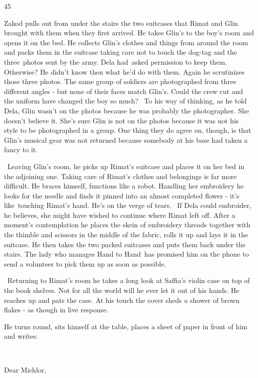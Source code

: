 \documentclass[letterpaper]{article}
\begin{document}
\bigskip

45 

Zakod pulls out from under the stairs the two suitcases that Rimat and Glin brought with them when they first arrived.
He takes Glin's to the boy's room and opens it on the bed. He collects Glin's clothes and things from around the room
and packs them in the suitcase taking care not to touch the dog-tag and the three~photos sent by the army. Dela
had~asked permission to keep them. Otherwise? He didn't know then what he'd do with them. Again he scrutinizes those
three photos. The same group of soldiers are photographed from three different angles - but none of their faces match
Glin's. Could the crew cut and the uniform have changed the boy so much? \ To his way of thinking, as he told Dela,
Glin wasn't on the photos because he was probably the photographer. She doesn't believe it. She's sure Glin is not on
the photos because it was not his style to be photographed in a group. One thing they do agree on, though, is that
Glin's musical gear was not returned because somebody at his base had taken a fancy to it. 

\ Leaving Glin's room, he picks up Rimat's suitcase and places it on her bed in the adjoining one. Taking care of
Rimat's clothes and belongings is far more difficult. He braces himself, functions like a robot. Handling her
embroidery he looks for the needle and finds it pinned into an almost completed flower - it's like~touching Rimat's
hand. He's on the verge of tears{.} \ If Dela could embroider, he believes, she
might have wished to continue where Rimat left off. After a moment's contemplation he places the skein of embroidery
threads together with the thimble and scissors in the middle of the fabric, rolls it up and lays it in the suitcase. He
then takes the two packed suitcases and puts them back under the stairs. The lady who manages {\textquotedbl}Hand to
Hand{\textquotedbl}~has promised him on the phone to send a volunteer to pick them up as soon as possible. 

\ Returning to Rimat's room he takes a long look at Saffia's violin case on top of the book shelves. Not for
all{ }the world will he ever let it out of his hands. He reaches up and pats
the case. At his touch the cover sheds a shower of brown flakes - as though in live response.

He turns round, sits himself at the table, places a sheet of paper in front of him and writes:

~

Dear Michlor,
\end{document}
